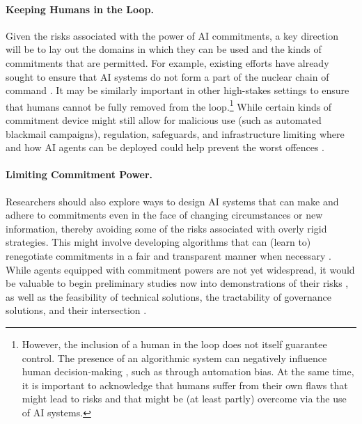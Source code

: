 \paragraph{Keeping Humans in the Loop.}
Given the risks associated with the power of AI commitments, a key direction will be to lay out the domains in which they can be used and the kinds of commitments that are permitted.
For example, existing efforts have already sought to ensure that AI systems do not form a part of the nuclear chain of command \citep{Renshaw2024,Congress2023}.
It may be similarly important in other high-stakes settings to ensure that humans cannot be fully removed from the loop.\footnote{However, the inclusion of a human in the loop does not itself guarantee control. The presence of an algorithmic system can negatively influence human decision-making \citep{green_algorithm_loop_2020,green_flaws_2022,crootof_humans_2023,skitka_does_1999,goddard_automation_2012,Borg2024}, such as through automation bias. At the same time, it is important to acknowledge that humans suffer from their own flaws that might lead to risks and that might be (at least partly) overcome via the use of AI systems.}
While certain kinds of commitment device might still allow for malicious use (such as automated blackmail campaigns), regulation, safeguards, and infrastructure limiting where and how AI agents can be deployed could help prevent the worst offences \citep{Kolt2024,Chan2025}.

\paragraph{Limiting Commitment Power.}
Researchers should also explore ways to design AI systems that can make and adhere to commitments even in the face of changing circumstances or new information, thereby avoiding some of the risks associated with overly rigid strategies.
This might involve developing algorithms that can (learn to) renegotiate commitments in a fair and transparent manner when necessary \citep{Sandholm2002,Ho2014,Wang2023,Cohen2023}.
While agents equipped with commitment powers are not yet widespread, it would be valuable to begin preliminary studies now into demonstrations of their risks \citep[and benefits, see, e.g.,][]{Christoffersen2023,zhu2025learning}, as well as the feasibility of technical solutions, the tractability of governance solutions, and their intersection \citep{reuel2024open,Kolt2024}.


